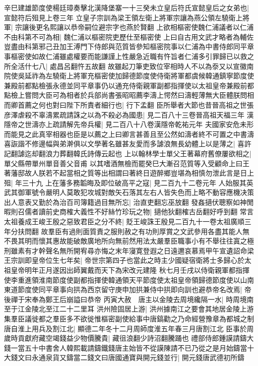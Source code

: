 辛巳建雄節度使楊廷璋奏擊北漢降堡寨一十三癸未立皇后符氏宣懿皇后之女弟也|{
	宣懿符后殂見上卷三年}
立皇子宗訓為梁王領左衛上將軍宗讓為燕公領左驍衛上將軍|{
	宗讓後更名熙讓以恭帝嗣位避宗字也燕於賢翻}
上欲相樞密使魏仁浦議者以仁浦不由科第不可為相|{
	魏仁浦以樞密院吏歷仕至樞密使}
上曰自古用文武才略者為輔佐豈盡由科第邪己丑加王溥門下侍郎與范質皆參知樞密院事以仁浦為中書侍郎同平章事樞密使如故仁浦雖處權要而能謙謹上性嚴急近職有忤旨者仁浦多引罪歸已以救之所全活什七八|{
	處昌呂翻忤五故翻}
故雖起刀筆吏致位宰相時人不以為沗又以宣徽南院使吳延祚為左驍衛上將軍充樞密使加歸德節度使侍衛將軍都虞候韓通鎮寧節度使兼殿前都點檢張永德並同平章事仍以通充侍衛親軍副都指揮使以太祖皇帝兼殿前都點檢上嘗問大臣可為相者於兵部尚書張昭昭薦李濤上愕然曰濤輕薄無大臣體朕問相而卿首薦之何也對曰陛下所責者細行也|{
	行下孟翻}
臣所舉者大節也昔晉高祖之世張彦澤虐殺不辜濤累疏請誅之以為不殺必為國患|{
	見二百八十三卷晉高祖天福三年}
漢隱帝之世濤亦上疏請解先帝兵權|{
	見二百八十八卷漢隱帝乾祐元年}
夫國家安危未形而能見之此真宰相器也臣是以薦之上曰卿言甚善且至公然如濤者終不可置之中書濤喜詼諧不修邊幅與弟澣俱以文學著名雖甚友愛而多謔浪無長幼體上以是薄之|{
	喜許記翻謔迄却翻浪力葬翻韓氏詩傳云起也}
上以翰林學士單父王著幕府舊僚屢欲相之|{
	單父縣帶單州單音善父音甫}
以其嗜酒無檢而罷癸巳大漸召范質等入受顧命上曰王著藩邸故人朕若不起當相之質等出相謂曰著終日遊醉鄉豈堪為相慎勿泄此言是日上殂|{
	年三十九}
上在藩多務韜晦及即位破高平之寇|{
	見二百九十二卷元年}
人始服其英武其御軍號令嚴明人莫敢犯攻城對敵矢石落其左右人皆失色而上略不動容應機决策出人意表又勤於為治百司簿籍過目無所忘|{
	治直吏翻忘巫放翻}
發姦擿伏聰察如神閒暇則召儒者讀前史商榷大義性不好絲竹珍玩之物|{
	擿他狄翻榷古岳翻好呼到翻}
常言太祖養成王峻王殷之惡致君臣之分不終|{
	貶王峻誅王殷見二百九十一卷太祖廣順三年分扶問翻}
故羣臣有過則面質責之服則赦之有功則厚賞之文武參用各盡其能人無不畏其明而懷其惠故能破敵廣地所向無前然用法太嚴羣臣職事小有不舉往往寘之極刑雖素有才幹聲名無所開宥尋亦悔之末年寖寛登遐之日遠邇哀慕焉甲午宣遺詔命梁王宗訓即皇帝位生七年矣|{
	帝世宗第四子也當此之時主少國疑宿衛將士多歸心於太祖皇帝明年正月遂因出師翼戴而天下為宋改元建隆}
秋七月壬戌以侍衛親軍都指揮使李重進領淮南節度使副都指揮使韓通領天平節度使太祖皇帝領歸德節度使以山南東道節度使同平章事向拱為西京留守庚申加拱兼侍中拱即向訓也避恭帝名改焉|{
	帝後禪于宋奉為鄭王后崩謚曰恭帝}
丙寅大赦　唐主以金陵去周境纔隔一水|{
	時周境南至于江金陵北至江二十二里耳}
洪州險固居上游|{
	洪州據南江之要會其地居金陵上游}
集羣臣議徙都之羣臣多不欲徙惟樞密副使給事中唐鎬勸之乃命經營豫章為都城之制唐自淮上用兵及割江北|{
	顯德二年冬十二月周師度淮五年春三月唐割江北}
臣事於周歲時貢獻府藏空竭錢益少物價騰貴|{
	藏徂浪翻少詩沼翻騰踊也}
禮部侍郎鍾謨請鑄大錢一當五十中書舍人韓熙載請鑄鐵錢唐主始皆不從謨陳請不已乃從之是月始鑄當十大錢文曰永通泉貨又鑄當二錢文曰唐國通寶與開元錢並行|{
	開元錢唐武德初所鑄}
